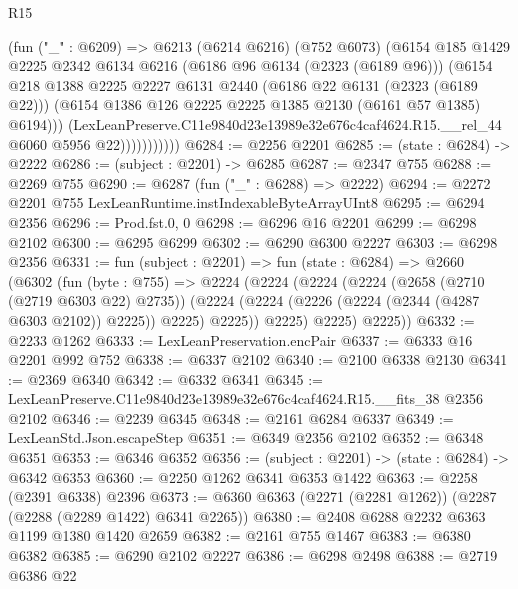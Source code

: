 \begin{lexlean}{R15}
\begin{coremodule}
                      (fun ("_" : @6209) =>
                      @6213
                        (@6214 @6216)
                        (@752 @6073)
                        (@6154
                          @185
                          @1429
                          @2225
                          @2342
                          @6134
                          @6216
                          (@6186 @96 @6134 (@2323 (@6189 @96)))
                          (@6154
                            @218
                            @1388
                            @2225
                            @2227
                            @6131
                            @2440
                            (@6186 @22 @6131 (@2323 (@6189 @22)))
                            (@6154 @1386 @126 @2225 @2225 @1385 @2130 (@6161 @57 @1385) @6194)))
                        (LexLeanPreserve.C11e9840d23e13989e32e676c4caf4624.R15.__rel_44
                          @6060
                          @5956
                          @22)))))))))))
@6284 := @2256 @2201
@6285 := (state : @6284) -> @2222
@6286 := (subject : @2201) -> @6285
@6287 := @2347 @755
@6288 := @2269 @755
@6290 := @6287 (fun ("_" : @6288) => @2222)
@6294 := @2272 @2201 @755 LexLeanRuntime.instIndexableByteArrayUInt8
@6295 := @6294 @2356
@6296 := Prod.fst.{0, 0}
@6298 := @6296 @16 @2201
@6299 := @6298 @2102
@6300 := @6295 @6299
@6302 := @6290 @6300 @2227
@6303 := @6298 @2356
@6331 := fun (subject : @2201) =>
  fun (state : @6284) =>
  @2660
    (@6302
      (fun (byte : @755) =>
      @2224
        (@2224
          (@2224
            (@2224
              (@2658 (@2710 (@2719 @6303 @22) @2735))
              (@2224 (@2224 (@2226 (@2224 (@2344 (@4287 @6303 @2102)) @2225)) @2225) @2225))
            @2225)
          @2225)
        @2225))
@6332 := @2233 @1262
@6333 := LexLeanPreservation.encPair
@6337 := @6333 @16 @2201 @992 @752
@6338 := @6337 @2102
@6340 := @2100 @6338 @2130
@6341 := @2369 @6340
@6342 := @6332 @6341
@6345 := LexLeanPreserve.C11e9840d23e13989e32e676c4caf4624.R15.__fits_38 @2356 @2102
@6346 := @2239 @6345
@6348 := @2161 @6284 @6337
@6349 := LexLeanStd.Json.escapeStep
@6351 := @6349 @2356 @2102
@6352 := @6348 @6351
@6353 := @6346 @6352
@6356 := (subject : @2201) -> (state : @6284) -> @6342 @6353
@6360 := @2250 @1262 @6341 @6353 @1422
@6363 := @2258 (@2391 @6338) @2396
@6373 := @6360 @6363 (@2271 (@2281 @1262)) (@2287 (@2288 (@2289 @1422) @6341 @2265))
@6380 := @2408 @6288 @2232 @6363 @1199 @1380 @1420 @2659
@6382 := @2161 @755 @1467
@6383 := @6380 @6382
@6385 := @6290 @2102 @2227
@6386 := @6298 @2498
@6388 := @2719 @6386 @22

\end{coremodule}
\end{lexlean}
